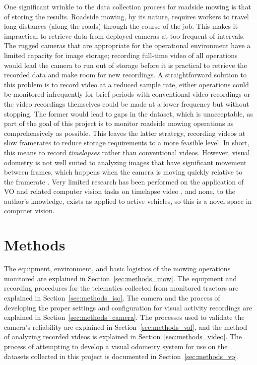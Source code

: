 \documentclass[
]{article}
\begin{document}
One significant wrinkle to the data collection process for roadside
mowing is that of storing the results. Roadside mowing, by its nature,
requires workers to travel long distances (along the roads) through the
course of the job. This makes it impractical to retrieve data from
deployed cameras at too frequent of intervals. The rugged cameras that
are appropriate for the operational environment have a limited capacity
for image storage; recording full-time video of all operations would
lead the camera to run out of storage before it is practical to retrieve
the recorded data and make room for new recordings. A straightforward
solution to this problem is to record video at a reduced sample rate,
either operations could be monitored infrequently for brief periods with
conventional video recordings or the video recordings themselves could
be made at a lower frequency but without stopping. The former would lead
to gaps in the dataset, which is unacceptable, as part of the goal of
this project is to monitor roadside mowing operations as comprehensively
as possible. This leaves the latter strategy, recording videos at slow
framerates to reduce storage requirements to a more feasible level. In
short, this means to record \emph{timelapses} rather than conventional
videos. However, visual odometry is not well suited to analyzing images
that have significant movement between frames, which happens when the
camera is moving quickly relative to the framerate
\parencite{Aqel_ReviewVisualOdometry_2016}. Very limited research has
been performed on the application of VO and related computer vision
tasks on timelapse video \parencite{Hendrickx_AiBasedTracking_2024}, and
none, to the author's knowledge, exists as applied to active vehicles,
so this is a novel space in computer vision.

\clearpage

\chapter{Methods}\label{methods}

The equipment, environment, and basic logistics of the mowing operations
monitored are explained in Section~\ref{sec:methods_mow}. The equipment
and recording procedures for the telematics collected from monitored
tractors are explained in Section~\ref{sec:methods_iso}. The camera and
the process of developing the proper settings and configuration for
visual activity recordings are explained in
Section~\ref{sec:methods_camera}. The processes used to validate the
camera's reliability are explained in Section~\ref{sec:methods_val}, and
the method of analyzing recorded videos is explained in
Section~\ref{sec:methods_video}. The process of attempting to develop a
visual odometry system for use on the datasets collected in this project
is documented in Section~\ref{sec:methods_vo}.
\end{document}
